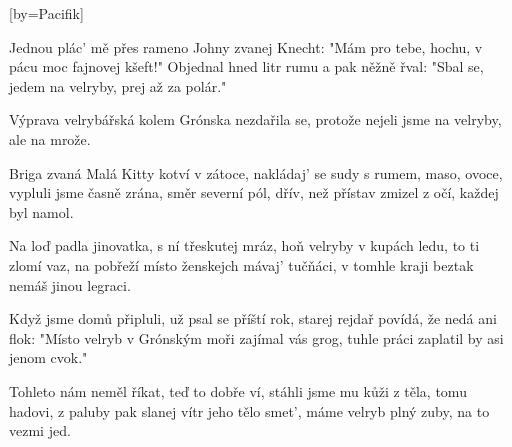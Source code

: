 [by={Pacifik}]

\beginverse{}
Jednou plác' mě přes rameno Johny zvanej Knecht:
"Mám pro tebe, hochu, v pácu moc fajnovej kšeft!"
Objednal hned litr rumu a pak něžně řval:
"Sbal se, jedem na velryby, prej až za polár."
\endverse{}

\beginchorus{}
\lrep{} Výprava velrybářská kolem Grónska nezdařila se,
protože nejeli jsme na velryby, ale na mrože. \rrep{}
\endchorus{}

\beginverse{}
Briga zvaná Malá Kitty kotví v zátoce,
nakládaj' se sudy s rumem, maso, ovoce,
vypluli jsme časně zrána, směr severní pól,
dřív, než přístav zmizel z očí, každej byl namol.
\endverse{}

\beginchorus{}
\phantom{}
\endchorus{}

\beginverse{}
Na loď padla jinovatka, s ní třeskutej mráz,
hoň velryby v kupách ledu, to ti zlomí vaz,
na pobřeží místo ženskejch mávaj' tučňáci,
v tomhle kraji beztak nemáš jinou legraci.
\endverse{}

\beginchorus{}
\phantom{}
\endchorus{}

\beginverse{}
Když jsme domů připluli, už psal se příští rok,
starej rejdař povídá, že nedá ani flok:
"Místo velryb v Grónským moři zajímal vás grog,
tuhle práci zaplatil by asi jenom cvok."
\endverse{}

\beginchorus{}
\phantom{}
\endchorus{}

\beginverse{}
Tohleto nám neměl říkat, teď to dobře ví,
stáhli jsme mu kůži z těla, tomu hadovi,
z paluby pak slanej vítr jeho tělo smet',
máme velryb plný zuby, na to vezmi jed.
\endverse{}

\beginchorus{}
\phantom{}
\endchorus{}

\endsong{}
